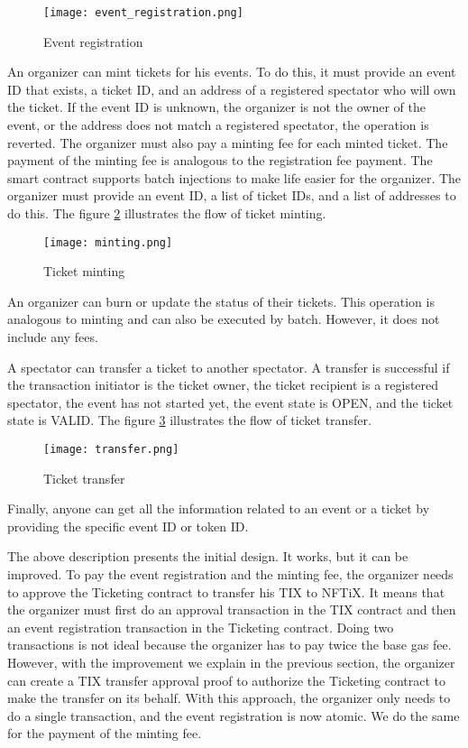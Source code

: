 \documentclass[a4paper,11pt,oneside]{report}
\begin{document}
\begin{figure}[h!]
  \texttt{[image: event\_registration.png]}
  \caption{Event registration}
  \label{fig:event_registration}
\end{figure}

An organizer can mint tickets for his events. To do this, it must provide an event ID that exists, a ticket ID, and an address of a registered spectator who will own the ticket. If the event ID is unknown, the organizer is not the owner of the event, or the address does not match a registered spectator, the operation is reverted. The organizer must also pay a minting fee for each minted ticket. The payment of the minting fee is analogous to the registration fee payment. The smart contract supports batch injections to make life easier for the organizer. The organizer must provide an event ID, a list of ticket IDs, and a list of addresses to do this. The figure \hyperref[fig:minting]{\ref{fig:minting}} illustrates the flow of ticket minting.

\begin{figure}[h!]
  \texttt{[image: minting.png]}
  \caption{Ticket minting}
  \label{fig:minting}
\end{figure}

An organizer can burn or update the status of their tickets. This operation is analogous to minting and can also be executed by batch. However, it does not include any fees.

A spectator can transfer a ticket to another spectator. A transfer is successful if the transaction initiator is the ticket owner, the ticket recipient is a registered spectator, the event has not started yet, the event state is OPEN, and the ticket state is VALID. The figure \hyperref[fig:transfer]{\ref{fig:transfer}} illustrates the flow of ticket transfer.

\begin{figure}[h!]
  \centering
  \texttt{[image: transfer.png]}
  \caption{Ticket transfer}
  \label{fig:transfer}
\end{figure}

Finally, anyone can get all the information related to an event or a ticket by providing the specific event ID or token ID.

The above description presents the initial design. It works, but it can be improved. To pay the event registration and the minting fee, the organizer needs to approve the Ticketing contract to transfer his TIX to NFTiX. It means that the organizer must first do an approval transaction in the TIX contract and then an event registration transaction in the Ticketing contract. Doing two transactions is not ideal because the organizer has to pay twice the base gas fee. However, with the improvement we explain in the previous section, the organizer can create a TIX transfer approval proof to authorize the Ticketing contract to make the transfer on its behalf. With this approach, the organizer only needs to do a single transaction, and the event registration is now atomic. We do the same for the payment of the minting fee.
\end{document}
